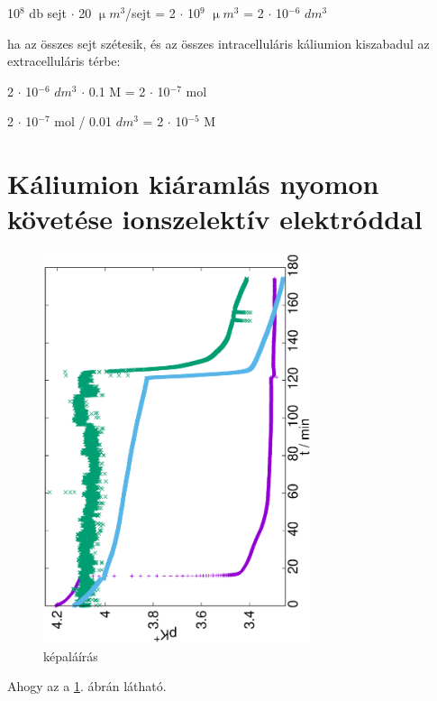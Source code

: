 10$^8$ db sejt $\cdot$ 20 $\upmu m^3$/sejt = 2 $\cdot$ 10$^9$ $\upmu m^3$ = 2 $\cdot$ 10$^{-6}$ $dm^3$

ha az összes sejt szétesik, és az összes intracelluláris káliumion kiszabadul az extracelluláris térbe:

2 $\cdot$ 10$^{-6}$ $dm^3$ $\cdot$ 0.1 M = 2 $\cdot$ 10$^{-7}$ mol

2 $\cdot$ 10$^{-7}$ mol / 0.01 $dm^3$ = 2 $\cdot$ 10$^{-5}$ M


\section{Káliumion kiáramlás nyomon követése ionszelektív elektróddal}

\begin{figure}
\centering
\includegraphics[width=0.7\textwidth, angle=-90]{img/mérés.eps}
\caption{képaláírás}
\label{fig:mérések}
\end{figure}

Ahogy az a \ref{fig:mérések}. ábrán látható.



